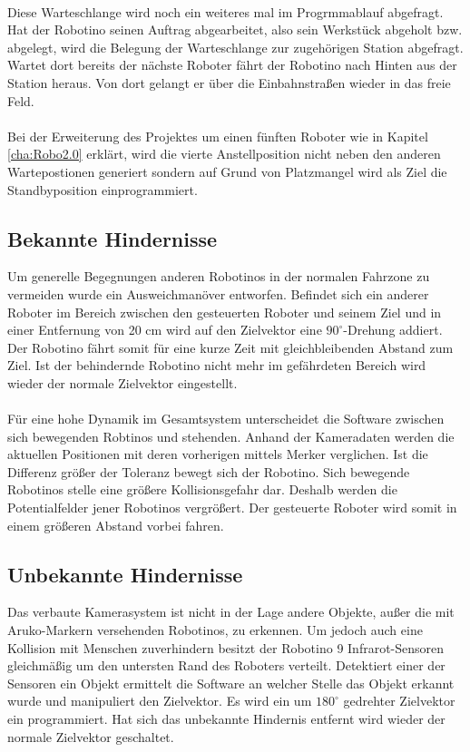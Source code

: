 \\
Diese Warteschlange wird noch ein weiteres mal im Progrmmablauf abgefragt. Hat der Robotino seinen Auftrag abgearbeitet, also sein Werkstück abgeholt bzw. abgelegt, wird die Belegung der Warteschlange zur zugehörigen Station abgefragt. Wartet dort bereits der nächste Roboter fährt der Robotino nach Hinten aus der Station heraus. Von dort gelangt er über die Einbahnstraßen wieder in das freie Feld.\\
\\
Bei der Erweiterung des Projektes um einen fünften Roboter wie in Kapitel \ref{cha:Robo2.0} erklärt, wird die vierte Anstellposition nicht neben den anderen Wartepostionen generiert sondern auf Grund von Platzmangel wird als Ziel die Standbyposition einprogrammiert.
 
\subsection{Bekannte Hindernisse}
\label{subsec:bekannt}
Um generelle Begegnungen anderen Robotinos in der normalen Fahrzone zu vermeiden wurde ein Ausweichmanöver entworfen. 
Befindet sich ein anderer Roboter im Bereich zwischen den gesteuerten Roboter und seinem Ziel und in einer Entfernung von 20 cm wird auf den Zielvektor eine $90^\circ$-Drehung addiert. Der Robotino fährt somit für eine kurze Zeit mit gleichbleibenden Abstand zum Ziel. Ist der behindernde Robotino nicht mehr im gefährdeten Bereich wird wieder der normale Zielvektor eingestellt.\\
\\
Für eine hohe Dynamik im Gesamtsystem unterscheidet die Software zwischen sich bewegenden Robtinos und stehenden. Anhand der Kameradaten werden die aktuellen Positionen mit deren vorherigen mittels Merker verglichen. Ist die Differenz größer der Toleranz bewegt sich der Robotino. Sich bewegende Robotinos stelle eine größere Kollisionsgefahr dar. Deshalb werden die Potentialfelder jener Robotinos vergrößert. Der gesteuerte Roboter wird somit in einem größeren Abstand vorbei fahren.

\subsection{Unbekannte Hindernisse}

Das verbaute Kamerasystem ist nicht in der Lage andere Objekte, außer die mit Aruko-Markern versehenden Robotinos, zu erkennen. Um jedoch auch eine Kollision mit Menschen zuverhindern besitzt der Robotino 9 Infrarot-Sensoren gleichmäßig um den untersten Rand des Roboters verteilt. Detektiert einer der Sensoren ein Objekt ermittelt die Software an welcher Stelle das Objekt erkannt wurde und manipuliert den Zielvektor. Es wird ein um $180^\circ$ gedrehter Zielvektor ein programmiert.
Hat sich das unbekannte Hindernis entfernt wird wieder der normale Zielvektor geschaltet.
\newpage
